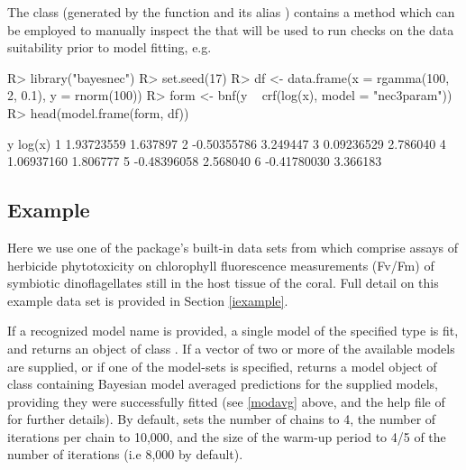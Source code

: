 \documentclass[
  shortnames]{jss}
\begin{document}
The class  (generated by the function  and its alias ) contains a  method which can be employed to manually inspect the  that will be used to run checks on the data suitability prior to model fitting, e.g.

\begin{CodeChunk}
\begin{CodeInput}
R> library("bayesnec")
R> set.seed(17)
R> df <- data.frame(x = rgamma(100, 2, 0.1), y = rnorm(100))
R> form <- bnf(y ~ crf(log(x), model = "nec3param"))
R> head(model.frame(form, df))
\end{CodeInput}
\begin{CodeOutput}
            y   log(x)
1  1.93723559 1.637897
2 -0.50355786 3.249447
3  0.09236529 2.786040
4  1.06937160 1.806777
5 -0.48396058 2.568040
6 -0.41780030 3.366183
\end{CodeOutput}
\end{CodeChunk}

\subsection[Example]{Example}\label{example}

Here we use one of the package's built-in data sets from \citet{jones2003meps} which comprise assays of herbicide phytotoxicity on chlorophyll fluorescence measurements (Fv/Fm) of symbiotic dinoflagellates still in the host tissue of the coral. Full detail on this example data set is provided in Section \ref{iexample}.

\begin{CodeChunk}
\end{CodeChunk}

If a recognized model name is provided, a single model of the specified type is fit, and  returns an object of class . If a vector of two or more of the available models are supplied, or if one of the model-sets is specified,  returns a model object of class  containing Bayesian model averaged predictions for the supplied models, providing they were successfully fitted (see \ref{modavg} above, and the help file of  for further details). By default,  sets the number of chains to 4, the number of iterations per chain to 10,000, and the size of the warm-up period to 4/5 of the number of iterations (i.e 8,000 by default).
\end{document}
